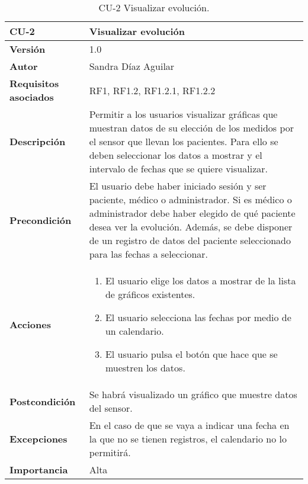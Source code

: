 \begin{table}[p]
	\centering
	\begin{tabularx}{\linewidth}{ p{} p{} }
		\toprule
		\textbf{CU-2}    & \textbf{Visualizar evolución}\\
		\toprule
		\textbf{Versión}              & 1.0    \\
		\textbf{Autor}                & Sandra Díaz Aguilar \\
		\textbf{Requisitos asociados} & RF1, RF1.2, RF1.2.1, RF1.2.2 \\
		\textbf{Descripción}          & Permitir a los usuarios visualizar gráficas que muestran datos de su elección de los medidos por el sensor que llevan los pacientes. Para ello se deben seleccionar los datos a mostrar y el intervalo de fechas que se quiere visualizar. \\
		\textbf{Precondición}         & El usuario debe haber iniciado sesión y ser paciente, médico o administrador. Si es médico o administrador debe haber elegido de qué paciente desea ver la evolución. Además, se debe disponer de un registro de datos del paciente seleccionado para las fechas a seleccionar.  \\
		\textbf{Acciones}             &
		\begin{enumerate}
			\def\labelenumi{\arabic{enumi}.}
			\tightlist
			\item El usuario elige los datos a mostrar de la lista de gráficos existentes.
			\item El usuario selecciona las fechas por medio de un calendario. 
            \item El usuario pulsa el botón que hace que se muestren los datos. 
		\end{enumerate}\\
		\textbf{Postcondición}        & Se habrá visualizado un gráfico que muestre datos del sensor. \\
		\textbf{Excepciones}          & En el caso de que se vaya a indicar una fecha en la que no se tienen registros, el calendario no lo permitirá. \\
		\textbf{Importancia}          & Alta \\
		\bottomrule
	\end{tabularx}
	\caption{CU-2 Visualizar evolución.}
\end{table}


